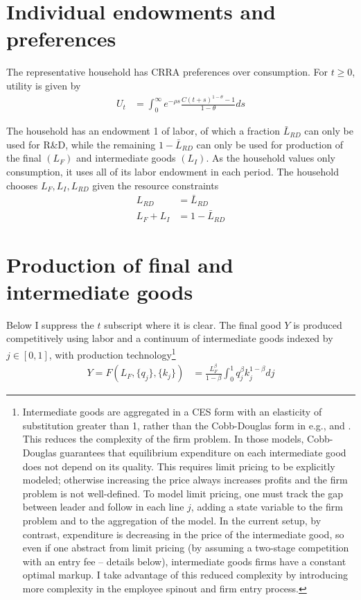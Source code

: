 \documentclass[12pt,english]{article}
\theoremstyle{remark}
\begin{document}
\section{Individual endowments and preferences}

The representative household has CRRA preferences over consumption. For $t \ge 0$, utility is given by 
\begin{align}
U_t &= \int_0^{\infty} e^{-\rho s} \frac{C(t+s)^{1-\theta} - 1}{1-\theta} ds \label{preferences}
\end{align}

The household has an endowment 1 of labor, of which a fraction $\bar{L}_{RD}$ can only be used for R\&D, while the remaining $1 - \bar{L}_{RD}$ can only be used for production of the final $(L_F)$ and intermediate goods $(L_I)$. As the household values only consumption, it uses all of its labor endowment in each period. The household chooses $L_F,L_I,L_{RD}$ given the resource constraints
\begin{align}
L_{RD} &= \bar{L}_{RD} \label{labor_resource_constraint2} \\
L_F + L_I &= 1 - \bar{L}_{RD} \label{labor_resource_constraint} 
\end{align}

\section{Production of final and intermediate goods}

Below I suppress the $t$ subscript where it is clear. The final good $Y$ is produced competitively using labor and a continuum of intermediate goods indexed by $j \in [0,1]$, with production technology\footnote{Intermediate goods are aggregated in a CES form with an elasticity of substitution greater than 1, rather than the Cobb-Douglas form in e.g., \cite{grossman_quality_1991} and \cite{baslandze_spinout_2019}. This reduces the complexity of the firm problem. In those models, Cobb-Douglas guarantees that equilibrium expenditure on each intermediate good does not depend on its quality. This requires limit pricing to be explicitly modeled; otherwise increasing the price always increases profits and the firm problem is not well-defined. To model limit pricing, one must track the gap between leader and follow in each line $j$, adding a state variable to the firm problem and to the aggregation of the model. In the current setup, by contrast, expenditure is decreasing in the price of the intermediate good, so even if one abstract from limit pricing (by assuming a two-stage competition with an entry fee -- details below), intermediate goods firms have a constant optimal markup. I take advantage of this reduced complexity by introducing more complexity in the employee spinout and firm entry process.}
\begin{align}
Y = F(L_F,\{q_j\},\{k_j\}) &= \frac{L_F^{\beta}}{1-\beta} \int_0^1 q_j^{\beta} k_j^{1-\beta} dj \label{final_goods_production}
\end{align}
\end{document}

